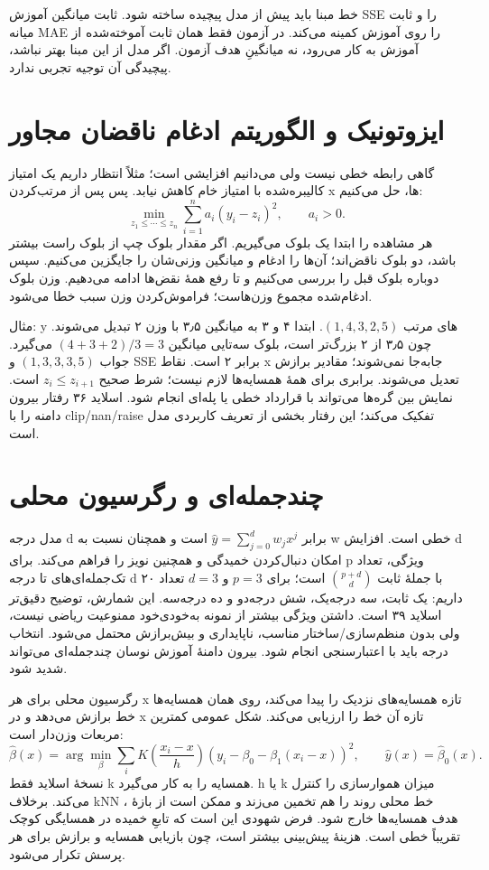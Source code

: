 خط مبنا باید پیش از مدل پیچیده ساخته شود. ثابت میانگین آموزش SSE را و ثابت میانه MAE را روی آموزش کمینه می‌کند. در آزمون فقط همان ثابت آموخته‌شده از آموزش به کار می‌رود، نه میانگینِ هدف آزمون. اگر مدل از این مبنا بهتر نباشد، پیچیدگی آن توجیه تجربی ندارد.

\section{ایزوتونیک و الگوریتم ادغام ناقضان مجاور}

گاهی رابطه خطی نیست ولی می‌دانیم افزایشی است؛ مثلاً انتظار داریم یک امتیاز کالیبره‌شده با امتیاز خام کاهش نیابد. پس پس از مرتب‌کردن x ها، حل می‌کنیم: \[
\min_{z_1\le\cdots\le z_n}\sum_{i=1}^n a_i(y_i-z_i)^2,\qquad a_i>0.
\] هر مشاهده را ابتدا یک بلوک می‌گیریم. اگر مقدار بلوک چپ از بلوک راست بیشتر باشد، دو بلوک ناقض‌اند؛ آن‌ها را ادغام و میانگین وزنی‌شان را جایگزین می‌کنیم. سپس دوباره بلوک قبل را بررسی می‌کنیم و تا رفع همهٔ نقض‌ها ادامه می‌دهیم. وزن بلوک ادغام‌شده مجموع وزن‌هاست؛ فراموش‌کردن وزن سبب خطا می‌شود.

مثال: y های مرتب \((1,4,3,2,5)\). ابتدا ۴ و ۳ به میانگین ۳٫۵ با وزن ۲ تبدیل می‌شوند. چون ۳٫۵ از ۲ بزرگ‌تر است، بلوک سه‌تایی میانگین \((4+3+2)/3=3\) می‌گیرد. جواب \((1,3,3,3,5)\) و SSE برابر ۲ است. نقاط x جابه‌جا نمی‌شوند؛ مقادیر برازش تعدیل می‌شوند. برابری برای همهٔ همسایه‌ها لازم نیست؛ شرط صحیح \(z_i\le z_{i+1}\) است. نمایش بین گره‌ها می‌تواند با قرارداد خطی یا پله‌ای انجام شود. اسلاید ۳۶ رفتار بیرون دامنه را با clip/nan/raise تفکیک می‌کند؛ این رفتار بخشی از تعریف کاربردی مدل است.

\section{چندجمله‌ای و رگرسیون محلی}

مدل درجه d برابر \(\widehat y=\sum_{j=0}^d w_jx^j\) است و همچنان نسبت به w خطی است. افزایش d امکان دنبال‌کردن خمیدگی و همچنین نویز را فراهم می‌کند. برای p ویژگی، تعداد تک‌جمله‌ای‌های تا درجه d با جملهٔ ثابت \(\binom{p+d}{d}\) است؛ برای $p=3$ و $d=3$ تعداد ۲۰ داریم: یک ثابت، سه درجه‌یک، شش درجه‌دو و ده درجه‌سه. این شمارش، توضیح دقیق‌تر اسلاید ۳۹ است. داشتن ویژگی بیشتر از نمونه به‌خودی‌خود ممنوعیت ریاضی نیست، ولی بدون منظم‌سازی/ساختار مناسب، ناپایداری و بیش‌برازش محتمل می‌شود. انتخاب درجه باید با اعتبارسنجی انجام شود. بیرون دامنهٔ آموزش نوسان چندجمله‌ای می‌تواند شدید شود.

رگرسیون محلی برای هر x تازه همسایه‌های نزدیک را پیدا می‌کند، روی همان همسایه‌ها خط برازش می‌دهد و در x تازه آن خط را ارزیابی می‌کند. شکل عمومی کمترین مربعات وزن‌دار است: \[
\widehat\beta(x)=\arg\min_\beta\sum_i K\!\left(\frac{x_i-x}{h}\right)(y_i-\beta_0-\beta_1(x_i-x))^2,
\qquad\widehat y(x)=\widehat\beta_0(x).
\] نسخهٔ اسلاید فقط k همسایه را به کار می‌گیرد. h یا k میزان هموارسازی را کنترل می‌کند. برخلاف kNN ، خط محلی روند را هم تخمین می‌زند و ممکن است از بازهٔ هدف همسایه‌ها خارج شود. فرض شهودی این است که تابعِ خمیده در همسایگی کوچک تقریباً خطی است. هزینهٔ پیش‌بینی بیشتر است، چون بازیابی همسایه و برازش برای هر پرسش تکرار می‌شود.


